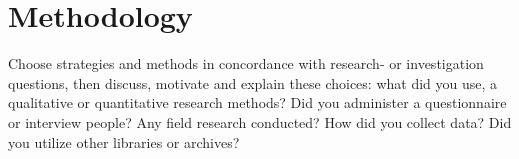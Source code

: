 %



\section{Methodology}

Choose strategies and methods in concordance with research- or investigation questions, then discuss, motivate and explain these choices: what did you use, a qualitative or quantitative research methods? Did you administer a questionnaire or interview people? Any field research conducted? How did you collect data? Did you utilize other libraries or archives?

